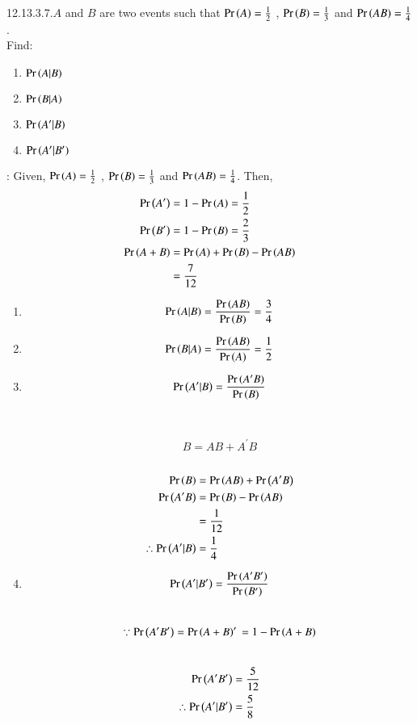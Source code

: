 \documentclass[journal,12pt,twocolumn]{IEEEtran}
\theoremstyle{remark}
\begin{document}
\renewcommand{\thefigure}{\theenumi}
\renewcommand{\thetable}{\theenumi}
12.13.3.7.$A$ and $B$ are two events such that $\Pr\left(A\right)= \frac{1}{2}$ , $\Pr\left(B\right)= \frac{1}{3}$ and $\Pr\left(AB\right)= \frac{1}{4}$.\\
Find:
\begin{enumerate}[label =\roman*]
\item $\Pr\left(A|B\right)$  \item $\Pr\left(B|A\right)$  \item $\Pr\left(A^{\prime}|B\right)$  \item $\Pr\left(A^{\prime}|B^{\prime}\right)$
\end{enumerate}
\solution:
Given, $\Pr\left(A\right)= \frac{1}{2}$ , $\Pr\left(B\right)= \frac{1}{3}$ and $\Pr\left(AB\right)= \frac{1}{4}$. Then,\\
\begin{equation}
\label{eq:12.13.3.7}
\begin{split}
\pr{A^{\prime}}&= 1-\pr{A} = \frac{1}{2}\\
\pr{B^{\prime}}&= 1-\pr{B} = \frac{2}{3}\\
\pr{A + B}&= \pr{A} +\pr{B} -\pr{AB}\\
&= \frac{7}{12}
\end{split}
\end{equation}
\begin{enumerate}
\item
\begin{equation}
\Pr\left(A|B\right)= \frac{\Pr\left(AB\right)}{\Pr\left(B\right)}= \frac{3}{4}
\end{equation}
\item
\begin{equation}
\Pr\left(B|A\right)= \frac{\Pr\left(AB\right)}{\Pr\left(A\right)}= \frac{1}{2}
\end{equation}
\item
\[\Pr\left(A^{\prime}|B\right)= \frac{\Pr\left(A^{\prime} B\right)}{\Pr\left(B\right)}\]\\
\\
\[B= AB +A^{\prime} B\]\\
\begin{equation}
\begin{split}
\Pr\left(B\right)&= \Pr\left(AB\right) +\Pr\left(A^{\prime} B\right)\\
\Pr\left(A^{\prime} B\right)&= \Pr\left(B\right) - \Pr\left(AB\right)\\
&= \frac{1}{12}\\
\therefore \Pr\left(A^{\prime}|B\right)&= \frac{1}{4}
\end{split}
\end{equation}
\item
\[\Pr\left(A^{\prime}|B^{\prime}\right)= \frac{\Pr\left(A^{\prime} B^{\prime}\right)}{\Pr\left(B^{\prime}\right)}\]\\
\[\because \Pr\left(A^{\prime} B^{\prime}\right)= \Pr\left(A + B\right)^{\prime}\\
= 1- \Pr\left(A + B\right)\]\\
\begin{equation}
\begin{split}
\Pr\left(A^{\prime} B^{\prime}\right)&= \frac{5}{12}\\
\therefore \Pr\left(A^{\prime}|B^{\prime}\right)&= \frac{5}{8}
\end{split}
\end{equation}
\end{enumerate}
\end{document}
